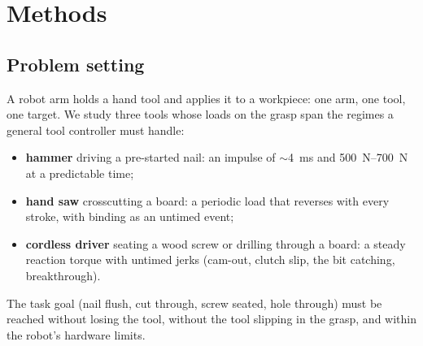 
\section{Methods}
\label{sec:methods}

\subsection{Problem setting}
A robot arm holds a hand tool and applies it to a workpiece: one arm, one tool, one target. We study three tools
whose loads on the grasp span the regimes a general tool controller must handle:
\begin{itemize}
  \item \textbf{hammer} driving a pre-started nail: an impulse of $\sim$\SI{4}{\milli\second} and
    \SIrange{500}{700}{\newton} at a predictable time;
  \item \textbf{hand saw} crosscutting a board: a periodic load that reverses with every stroke, with binding as an
    untimed event;
  \item \textbf{cordless driver} seating a wood screw or drilling through a board: a steady reaction torque with
    untimed jerks (cam-out, clutch slip, the bit catching, breakthrough).
\end{itemize}
The task goal (nail flush, cut through, screw seated, hole through) must be reached without losing the tool,
without the tool slipping in the grasp, and within the robot's hardware limits.

